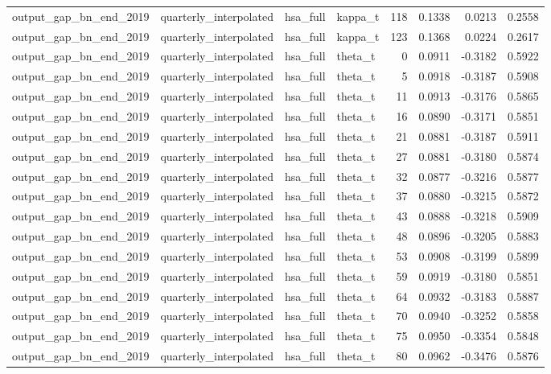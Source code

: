 \begin{tabular}{llllrrrr}
output\_gap\_bn\_end\_2019 & quarterly\_interpolated & hsa\_full & kappa\_t & 118 & 0.1338 & 0.0213 & 0.2558 \\
output\_gap\_bn\_end\_2019 & quarterly\_interpolated & hsa\_full & kappa\_t & 123 & 0.1368 & 0.0224 & 0.2617 \\
output\_gap\_bn\_end\_2019 & quarterly\_interpolated & hsa\_full & theta\_t & 0 & 0.0911 & -0.3182 & 0.5922 \\
output\_gap\_bn\_end\_2019 & quarterly\_interpolated & hsa\_full & theta\_t & 5 & 0.0918 & -0.3187 & 0.5908 \\
output\_gap\_bn\_end\_2019 & quarterly\_interpolated & hsa\_full & theta\_t & 11 & 0.0913 & -0.3176 & 0.5865 \\
output\_gap\_bn\_end\_2019 & quarterly\_interpolated & hsa\_full & theta\_t & 16 & 0.0890 & -0.3171 & 0.5851 \\
output\_gap\_bn\_end\_2019 & quarterly\_interpolated & hsa\_full & theta\_t & 21 & 0.0881 & -0.3187 & 0.5911 \\
output\_gap\_bn\_end\_2019 & quarterly\_interpolated & hsa\_full & theta\_t & 27 & 0.0881 & -0.3180 & 0.5874 \\
output\_gap\_bn\_end\_2019 & quarterly\_interpolated & hsa\_full & theta\_t & 32 & 0.0877 & -0.3216 & 0.5877 \\
output\_gap\_bn\_end\_2019 & quarterly\_interpolated & hsa\_full & theta\_t & 37 & 0.0880 & -0.3215 & 0.5872 \\
output\_gap\_bn\_end\_2019 & quarterly\_interpolated & hsa\_full & theta\_t & 43 & 0.0888 & -0.3218 & 0.5909 \\
output\_gap\_bn\_end\_2019 & quarterly\_interpolated & hsa\_full & theta\_t & 48 & 0.0896 & -0.3205 & 0.5883 \\
output\_gap\_bn\_end\_2019 & quarterly\_interpolated & hsa\_full & theta\_t & 53 & 0.0908 & -0.3199 & 0.5899 \\
output\_gap\_bn\_end\_2019 & quarterly\_interpolated & hsa\_full & theta\_t & 59 & 0.0919 & -0.3180 & 0.5851 \\
output\_gap\_bn\_end\_2019 & quarterly\_interpolated & hsa\_full & theta\_t & 64 & 0.0932 & -0.3183 & 0.5887 \\
output\_gap\_bn\_end\_2019 & quarterly\_interpolated & hsa\_full & theta\_t & 70 & 0.0940 & -0.3252 & 0.5858 \\
output\_gap\_bn\_end\_2019 & quarterly\_interpolated & hsa\_full & theta\_t & 75 & 0.0950 & -0.3354 & 0.5848 \\
output\_gap\_bn\_end\_2019 & quarterly\_interpolated & hsa\_full & theta\_t & 80 & 0.0962 & -0.3476 & 0.5876 \\

\end{tabular}
